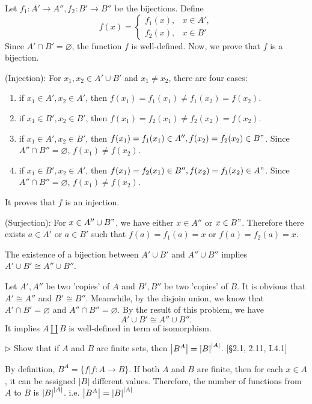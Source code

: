 \begin{solution}
Let $f_1: A'\to A'', f_2: B'\to B''$ be the bijections. Define 
$$f(x)=\begin{cases}
	f_1(x), &x\in A',\\
	f_2(x), &x\in B' 	
\end{cases}$$
Since $A'\cap B'=\varnothing$, the function $f$ is well-defined. Now, we prove that $f$ is a bijection.

(Injection): For $x_1, x_2\in A'\cup B'$ and $x_1\neq x_2$, there are four cases:
\begin{enumerate}
\item if $x_1\in A', x_2\in A'$, then $f(x_1)=f_1(x_1)\neq f_1(x_2) = f(x_2)$.
\item if $x_1\in B', x_2\in B'$, then $f(x_1)=f_2(x_1)\neq f_2(x_2) = f(x_2)$.
\item if $x_1\in A', x_2\in B'$, then $f(x_1)=f_1(x_1)\in A'', f(x_2)=f_2(x_2)\in B"$. Since $A''\cap B'' = \varnothing$, $f(x_1)\neq f(x_2)$.
\item if $x_1\in B', x_2\in A'$, then $f(x_1)=f_2(x_1)\in B'', f(x_2)=f_1(x_2)\in A"$. Since $A''\cap B'' = \varnothing$, $f(x_1)\neq f(x_2)$.
\end{enumerate}
It proves that $f$ is an injection.


(Surjection): For $x\in A''\cup B"$, we have either $x\in A''$ or $x\in B"$. Therefore there exists $a\in A'$ or $a\in B'$ such that $f(a)=f_1(a)=x$ or $f(a)=f_2(a)=x$.

The existence of a bijection between $A'\cup B'$ and $A''\cup B''$ implies $A'\cup B'\cong A''\cup B''$.

Let $A', A''$ be two 'copies' of $A$ and $B', B''$ be two 'copies' of $B$. It is obvious that $A'\cong A''$ and $B'\cong B''$. 
Meanwhile, by the disjoin union, we know that $A'\cap B'=\varnothing$ and $A''\cap B''=\varnothing$. By the result of this problem, we have 
$$A'\cup B'\cong A''\cup B''.$$ It implies $A\coprod B$ is well-defined in term of isomorphism.   
\end{solution}

\hypertarget{Exercise I.2.10}{}
\begin{problem}[2.10]
  $\rhd$ Show that if $A$ and $B$ are finite sets, then $\left|B^A\right| =
  \left|B\right|^{\left|A\right|}$. [\S2.1, 2.11, I.4.1]
\end{problem}

\begin{solution}
By definition, $B^A = \{f | f: A\to B\}$. If both $A$ and $B$ are finite, then for each $x\in A$, it can be assigned $|B|$ different values. 
Therefore, the number of functions from $A$ to $B$ is $\left|B\right|^{\left|A\right|}$. i.e. $\left|B^A\right| =
  \left|B\right|^{\left|A\right|}$
\end{solution}

